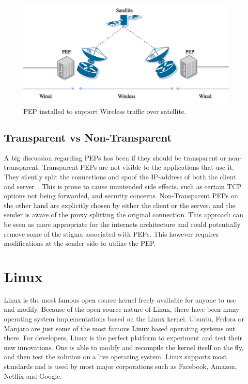 \documentclass[a4paper,english, 11pt]{report}
\begin{document}
\begin{figure}[h] %
	\centering
	\includegraphics[scale=0.50]{../diagrams/drawio/pep_satellite.png}
  	\caption{PEP installed to support Wireless traffic over satellite.}
  	\label{fig:blockage}
\end{figure}

\subsection{Transparent vs Non-Transparent}
A big discussion regarding PEPs has been if they should be transparent or non-transparent. Transparent PEPs are not visible to the applications that use it. They silently split the connections and spoof the IP-address of both the client and server~\cite{pep_dna}. This is prone to cause unintended side effects, such as certain TCP options not being forwarded, and security concerns. Non-Transparent PEPs on the other hand are explicitly chosen by either the client or the server, and the sender is aware of the proxy splitting the original connection. This approach can be seen as more appropriate for the internets architecture and could potentially remove some of the stigma associated with PEPs. This however requires modifications at the sender side to utilize the PEP.

\section{Linux}

Linux is the most famous open source kernel freely available for anyone to use and modify. Because of the open source nature of Linux, there have been many operating system implementations based on the Linux kernel. Ubuntu, Fedora or Manjaro are just some of the most famous Linux based operating systems out there. For developers, Linux is the perfect platform to experiment and test their new innovations. One is able to modify and recompile the kernel itself on the fly, and then test the solution on a live operating system. Linux supports most standards and is used by most major corporations such as Facebook, Amazon, Netflix and Google.
\end{document}
